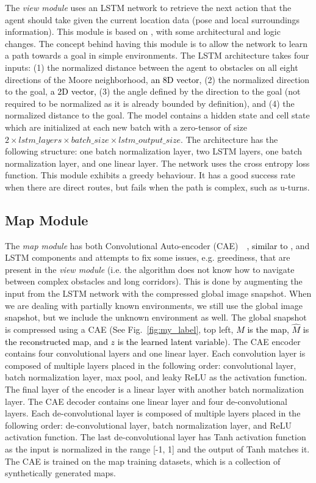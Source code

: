 \documentclass[journal, twocolumn]{IEEEtran}
\begin{document}
The \emph{view module} uses an LSTM network \cite{hochreiter1997long} to retrieve the next action that the agent should take given the current location data (pose and local surroundings information). This module is based on \cite{nicola2018lstm}, with some architectural and logic changes. The concept behind having this module is to allow the network to learn a path towards a goal in simple environments. 
%
The LSTM architecture takes four inputs: (1) the normalized distance between the agent to obstacles on all eight directions of the Moore neighborhood, \textcolor{black}{an 8D vector}, 
(2) the normalized direction to the goal, \textcolor{black}{a 2D vector,}  
(3) the angle defined by the direction to the goal (not required to be normalized as it is already bounded by definition), and 
(4) the normalized distance to the goal. 
%
The model contains a hidden state and cell state which are initialized at each new batch with a zero-tensor of size $2 \times lstm\_layers \times batch\_size \times lstm\_output\_size$. The architecture has the following structure: one batch normalization layer, two LSTM layers, one batch normalization layer, and one linear layer. The network uses the cross entropy loss function. 
%
This module exhibits a greedy behaviour. It has a good success rate when there are direct routes, but fails when the path is complex, such as u-turns.

\subsection{Map Module} \label{sec:map_module}


The \emph{map module} has both Convolutional Auto-encoder (CAE)~\textcolor{black}{~\cite{inoue2019robot}, similar to \cite{Everett_IROS_2019},} and LSTM components and attempts to fix some issues, e.g. greediness, that are present in the \emph{view module} (i.e. the algorithm does not know how to navigate between complex obstacles and long corridors). This is done by augmenting the input from the LSTM network with the compressed global image snapshot. When we are dealing with partially known environments, we still use the global image snapshot, but we include the unknown environment as well. The global snapshot is compressed using a CAE (See Fig.~\ref{fig:my_label}, top left, \textcolor{black}{$M$ is the map, $\hat{M}$ is the reconstructed map, and $z$ is the learned latent variable}).
%
The CAE encoder contains four convolutional layers and one linear layer. 
Each convolution layer is composed of multiple layers placed in the following order: convolutional layer, batch normalization layer, max pool, and leaky ReLU as the activation function. The final layer of the encoder is a linear layer with another batch normalization layer. 
%
The CAE decoder contains one linear layer and four de-convolutional layers.  Each de-convolutional layer is composed of multiple layers placed in the following order: de-convolutional layer, batch normalization layer, and ReLU activation function. The last de-convolutional layer has Tanh activation function as the input is normalized in the range [-1, 1] and the output of Tanh matches it.
%
The CAE is trained on the map training datasets, which is a collection of synthetically generated maps. 
\end{document}
